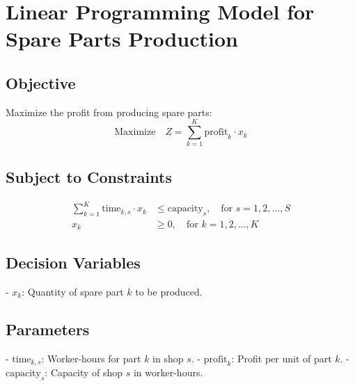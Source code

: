 \documentclass{article}
\begin{document}
\section*{Linear Programming Model for Spare Parts Production}

\subsection*{Objective}
Maximize the profit from producing spare parts:
\[
\text{Maximize} \quad Z = \sum_{k=1}^{K} \text{profit}_k \cdot x_k
\]

\subsection*{Subject to Constraints}
\begin{align*}
\sum_{k=1}^{K} \text{time}_{k, s} \cdot x_k & \leq \text{capacity}_s, \quad \text{for } s = 1, 2, \ldots, S \\
x_k & \geq 0, \quad \text{for } k = 1, 2, \ldots, K
\end{align*}

\subsection*{Decision Variables}
- \( x_k \): Quantity of spare part \( k \) to be produced.

\subsection*{Parameters}
- \( \text{time}_{k, s} \): Worker-hours for part \( k \) in shop \( s \).
- \( \text{profit}_k \): Profit per unit of part \( k \).
- \( \text{capacity}_s \): Capacity of shop \( s \) in worker-hours.
\end{document}
